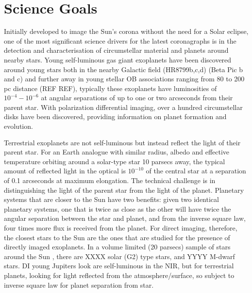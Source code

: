 \documentclass[letterpaper]{ar-1col}
\begin{document}
\section{Science Goals}

Initially developed to image the Sun's corona without the need for a Solar eclipse, one of the most significant science drivers for the latest coronagraphs is in the detection and characterisation of circumstellar material and planets around nearby stars.
%
Young self-luminous gas giant exoplanets have been discovered around young stars both in the nearby Galactic field (HR8799b,c,d) (Beta Pic b and c) and further away in young stellar OB associations ranging from 80 to 200 pc distance (REF REF), typically these exoplanets have luminosities of $10^{-4}-10^{-6}$ at angular separations of up to one or two arcseconds from their parent star. 
%
With polarization differential imaging, over a hundred circumstellar disks have been discovered, providing information on planet formation and evolution.

\begin{armarginnote}[]
\end{armarginnote}

%
Terrestrial exoplanets are not self-luminous but instead reflect the light of their parent star.
%
For an Earth analogue with similar radius, albedo and effective temperature orbiting around a solar-type star 10 parsecs away, the typical amount of reflected light in the optical is $10^{-10}$ of the central star at a separation of 0.1 arcseconds at maximum elongation.
%
The technical challenge is in distinguishing the light of the parent star from the light of the planet.
Planetary systems that are closer to the Sun have two benefits: given two identical planetary systems, one that is twice as close as the other will have twice the angular separation between the star and planet, and from the inverse square law, four times more flux is received from the planet.
%
For direct imaging, therefore, the closest stars to the Sun are the ones that are studied for the presence of directly imaged exoplanets.
%
In a volume limited (20 parsecs) sample of stars around the Sun \citep{Kirkpatrick24}, there are XXXX solar (G2) type stars, and YYYY M-dwarf stars.
%
DI young Jupiters look are self-luminous in the NIR, but for terrestrial planets, looking for light reflected from the atmosphere/surface, so subject to inverse square law for planet separation from star.
\end{document}
